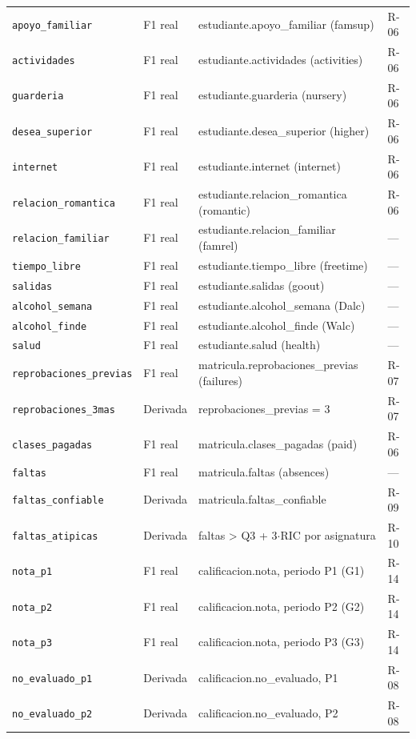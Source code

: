 {\begin{longtable}{>{\raggedright\arraybackslash}p{3.9cm}>{\raggedright\arraybackslash}p{2.3cm}>{\raggedright\arraybackslash}p{6.2cm}>{\raggedright\arraybackslash}p{2.1cm}}
\texttt{apoyo\_familiar} & F1 real & estudiante.apoyo\_familiar (famsup) & R-06 \\
\texttt{actividades} & F1 real & estudiante.actividades (activities) & R-06 \\
\texttt{guarderia} & F1 real & estudiante.guarderia (nursery) & R-06 \\
\texttt{desea\_superior} & F1 real & estudiante.desea\_superior (higher) & R-06 \\
\texttt{internet} & F1 real & estudiante.internet (internet) & R-06 \\
\texttt{relacion\_romantica} & F1 real & estudiante.relacion\_romantica (romantic) & R-06 \\
\texttt{relacion\_familiar} & F1 real & estudiante.relacion\_familiar (famrel) & — \\
\texttt{tiempo\_libre} & F1 real & estudiante.tiempo\_libre (freetime) & — \\
\texttt{salidas} & F1 real & estudiante.salidas (goout) & — \\
\texttt{alcohol\_semana} & F1 real & estudiante.alcohol\_semana (Dalc) & — \\
\texttt{alcohol\_finde} & F1 real & estudiante.alcohol\_finde (Walc) & — \\
\texttt{salud} & F1 real & estudiante.salud (health) & — \\
\texttt{reprobaciones\_previas} & F1 real & matricula.reprobaciones\_previas (failures) & R-07 \\
\texttt{reprobaciones\_3mas} & Derivada & reprobaciones\_previas = 3 & R-07 \\
\texttt{clases\_pagadas} & F1 real & matricula.clases\_pagadas (paid) & R-06 \\
\texttt{faltas} & F1 real & matricula.faltas (absences) & — \\
\texttt{faltas\_confiable} & Derivada & matricula.faltas\_confiable & R-09 \\
\texttt{faltas\_atipicas} & Derivada & faltas > Q3 + 3$\cdot$RIC por asignatura & R-10 \\
\texttt{nota\_p1} & F1 real & calificacion.nota, periodo P1 (G1) & R-14 \\
\texttt{nota\_p2} & F1 real & calificacion.nota, periodo P2 (G2) & R-14 \\
\texttt{nota\_p3} & F1 real & calificacion.nota, periodo P3 (G3) & R-14 \\
\texttt{no\_evaluado\_p1} & Derivada & calificacion.no\_evaluado, P1 & R-08 \\
\texttt{no\_evaluado\_p2} & Derivada & calificacion.no\_evaluado, P2 & R-08 \\

\end{longtable}}
